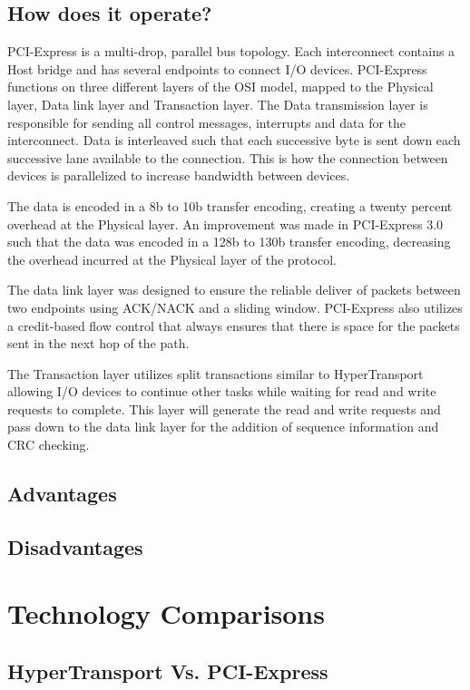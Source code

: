\documentclass[conference]{IEEEtran}
\begin{document}
\subsection{How does it operate?}
\label{sub:pci:oper}
PCI-Express is a multi-drop, parallel bus topology. Each interconnect contains a
Host bridge and has several endpoints to connect I/O
devices\cite{bhatt2003creating}. PCI-Express functions on three different layers
of the OSI model, mapped to the Physical layer, Data link layer and Transaction
layer. The Data transmission layer is responsible for sending all control
messages, interrupts and data for the interconnect. Data is interleaved such
that each successive byte is sent down each successive lane available to the
connection. This is how the connection between devices is parallelized to
increase bandwidth between devices. 

The data is encoded in a 8b to 10b transfer
encoding, creating a twenty percent overhead at the Physical layer. An
improvement was made in PCI-Express 3.0 such that the data was encoded in a 128b
to 130b transfer encoding, decreasing the overhead incurred at the Physical
layer of the protocol.

The data link layer was designed to ensure the reliable deliver of packets
between two endpoints using ACK/NACK and a sliding window. PCI-Express also
utilizes a credit-based flow control that always ensures that there is space for
the packets sent in the next hop of the path.

The Transaction layer utilizes split transactions similar to HyperTransport
allowing I/O devices to continue other tasks while waiting for read and write
requests to complete. This layer will generate the read and write requests and
pass down to the data link layer for the addition of sequence information and
CRC checking. 



\subsection{Advantages}
\subsection{Disadvantages}

\section{Technology Comparisons}
\subsection{HyperTransport Vs. PCI-Express}
\end{document}
